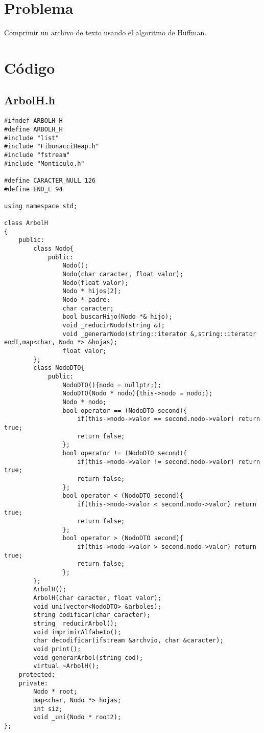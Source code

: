 \documentclass[a4paper,12pt]{article}
\begin{document}
  \section{Problema}
    Comprimir un archivo de texto usando el algoritmo de Huffman.
  \section{Código} 
    \subsection{ArbolH.h}
      \begin{lstlisting}
#ifndef ARBOLH_H
#define ARBOLH_H
#include "list"
#include "FibonacciHeap.h"
#include "fstream"
#include "Monticulo.h"

#define CARACTER_NULL 126
#define END_L 94

using namespace std;

class ArbolH
{
    public:
        class Nodo{
            public:
                Nodo();
                Nodo(char caracter, float valor);
                Nodo(float valor);
                Nodo * hijos[2];
                Nodo * padre;
                char caracter;
                bool buscarHijo(Nodo *& hijo);
                void _reducirNodo(string &);
                void _generarNodo(string::iterator &,string::iterator endI,map<char, Nodo *> &hojas);
                float valor;
        };
        class NodoDTO{
            public:
                NodoDTO(){nodo = nullptr;};
                NodoDTO(Nodo * nodo){this->nodo = nodo;};
                Nodo * nodo;
                bool operator == (NodoDTO second){
                    if(this->nodo->valor == second.nodo->valor) return true;
                    return false;
                };
                bool operator != (NodoDTO second){
                    if(this->nodo->valor != second.nodo->valor) return true;
                    return false;
                };
                bool operator < (NodoDTO second){
                    if(this->nodo->valor < second.nodo->valor) return true;
                    return false;
                };
                bool operator > (NodoDTO second){
                    if(this->nodo->valor > second.nodo->valor) return true;
                    return false;
                };
        };
        ArbolH();
        ArbolH(char caracter, float valor);
        void uni(vector<NodoDTO> &arboles);
        string codificar(char caracter);
        string  reducirArbol();
        void imprimirAlfabeto();
        char decodificar(ifstream &archvio, char &caracter);
        void print();
        void generarArbol(string cod);
        virtual ~ArbolH();
    protected:
    private:
        Nodo * root;
        map<char, Nodo *> hojas;
        int siz;
        void _uni(Nodo * root2);
};


\end{lstlisting}
\end{document}
